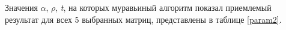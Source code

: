 \documentclass[a4paper,12pt]{article}
\begin{document}

\pagebreak



\pagebreak


\pagebreak

Значения $\alpha$, $\rho$, \textit{t}, на которых муравьиный
алгоритм показал приемлемый результат для всех 5 выбранных матриц,
представлены в таблице \ref{param2}.

\pagebreak
\end{document}
